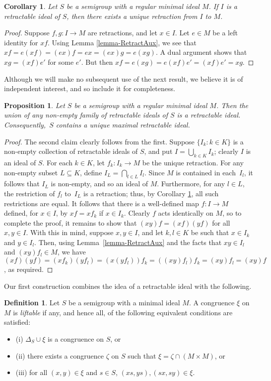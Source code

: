 \documentclass[11pt,a4paper]{article}
\newcommand{\De}{\Delta}
\newcommand{\set}[2]{\{ {#1} : {#2} \}}
\newcommand{\1}{\id_n}
\newcommand{\sub}{\subseteq}
\newcommand{\bit}{\begin{itemize}}
\newcommand{\eit}{\end{itemize}}
\newcommand{\pf}{\begin{proof}}
\newcommand{\epf}{\end{proof}}
\numberwithin{equation}{section}
\newtheorem{cor}[equation]{Corollary}
\newtheorem{prop}[equation]{Proposition}
\theoremstyle{definition}
\newtheorem{defn}[equation]{Definition}
\begin{document}
\begin{cor}\label{cor:retract_unique}
Let $S$ be a semigroup with a regular minimal ideal $M$.  If $I$ is a retractable ideal of $S$, then there exists a unique retraction from $I$ to $M$.
\end{cor}

\pf
Suppose $f,g:I\to M$ are retractions, and let $x\in I$.  Let $e\in M$ be a
left identity for $xf$.  Using Lemma \ref{lemma-RetractAux}, we see that
$xf = e (xf) = (ex)f = ex = (ex)g = e (xg)$.  A dual argument shows that
$xg=(xf) e'$ for some $e'$.  But then $xf = e (xg) = e (xf)  e' = (xf)e'=xg$.
\epf

Although we will make no subsequent use of the next result, we believe it is of independent interest, and so include it for completeness.


\begin{prop}
Let $S$ be a semigroup with a regular minimal ideal $M$.  Then the union of any non-empty family of retractable ideals of $S$ is a retractable ideal.  Consequently,~$S$ contains a unique maximal retractable ideal.
\end{prop}

\pf The second claim clearly follows from the first.  Suppose $\set{I_k}{k\in K}$ is a non-empty collection of retractable ideals of $S$, and put $I=\bigcup_{k\in K}I_k$; clearly $I$ is an ideal of $S$.  For each $k\in K$, let $f_k:I_k\to M$ be the unique retraction.  For any non-empty subset $L\sub K$, define $I_L=\bigcap_{l\in L}I_l$.  Since $M$ is contained in each~$I_l$, it follows that $I_L$ is non-empty, and so an ideal of $M$.  Furthermore, for any $l\in L$, the restriction of $f_l$ to~$I_L$ is a retraction; thus, by Corollary \ref{cor:retract_unique}, all such restrictions are equal.  It follows that there is a well-defined map $f:I\to M$ defined, for $x\in I$, by $xf=xf_k$ if $x\in I_k$.  Clearly $f$ acts identically on $M$, so to complete the proof, it remains to show that $(xy)f=(xf)(yf)$ for all $x,y\in I$.  With this in mind, suppose $x,y\in I$, and let $k,l\in K$ be such that $x\in I_k$ and $y\in I_l$.  Then, using Lemma~\ref{lemma-RetractAux} and the facts that $xy\in I_l$ and $(xy)f_l\in M$, we have $(xf)(yf) = (xf_k)(yf_l) = (x(yf_l))f_k = ((xy)f_l)f_k = (xy)f_l = (xy)f$, as required.
\epf

Our first construction combines the idea of a retractable ideal with the following.



\begin{defn}\label{defn:lift}
Let $S$ be a semigroup with a minimal ideal $M$.  A congruence $\xi$ on $M$ is \emph{liftable} if any, and hence all, of the following equivalent conditions are satisfied:
\bit
\item[(i)] $\De_S\cup\xi$ is a congruence on $S$, or
\item[(ii)] there exists a congruence $\zeta$ on $S$ such that $\xi=\zeta\cap(M\times M)$, or
\item[(iii)] for all $(x,y)\in\xi$ and $s\in S$, $(xs,ys),(sx,sy)\in\xi$.
\eit
\end{defn}
\end{document}
